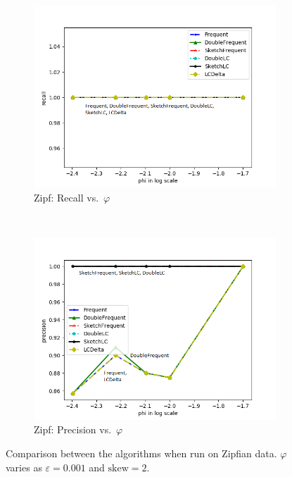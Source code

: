\documentclass[sigconf,review=true,anonymous=true,screen]{acmart}
\newcommand{\eps}{\varepsilon}
\renewcommand{\phi}{\varphi}
\begin{document}
\begin{figure}[!h]
\begin{subfigure}[b]{0.3\textwidth}
\includegraphics[width=\textwidth]{../Plots/recall_phiskew.png}
\caption{Zipf: Recall vs.~$\phi$}
\label{fig:ziprecphi}
\end{subfigure}
~
\begin{subfigure}[b]{0.3\textwidth}
\includegraphics[width=\textwidth]{../Plots/precision_phiskew.png}
\caption{Zipf: Precision vs.~$\phi$}
\label{fig:zipprephi}
\end{subfigure}
\caption{Comparison between the algorithms when run on Zipfian data. $\phi$ varies as $\eps = 0.001$ and $\text{skew} = 2$.}
\label{fig:varyphi}
\end{figure}
\end{document}
